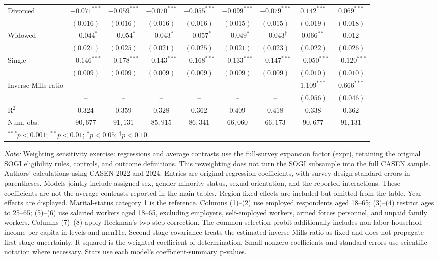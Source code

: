 \begin{table}[htpb]
{\begin{tabular}{l c c c c c c c c}
Divorced & $-0.071^{***}$ & $-0.059^{***}$ & $-0.070^{***}$ & $-0.055^{***}$ & $-0.099^{***}$ & $-0.079^{***}$ & $0.142^{***}$ & $0.069^{***}$ \\
 & $(0.016)$ & $(0.016)$ & $(0.016)$ & $(0.016)$ & $(0.015)$ & $(0.015)$ & $(0.019)$ & $(0.018)$ \\
Widowed & $-0.044^{*}$ & $-0.054^{*}$ & $-0.043^{*}$ & $-0.057^{*}$ & $-0.049^{*}$ & $-0.043^{\dagger}$ & $0.066^{**}$ & $0.012$ \\
 & $(0.021)$ & $(0.025)$ & $(0.021)$ & $(0.025)$ & $(0.021)$ & $(0.023)$ & $(0.022)$ & $(0.026)$ \\
Single & $-0.146^{***}$ & $-0.178^{***}$ & $-0.143^{***}$ & $-0.168^{***}$ & $-0.133^{***}$ & $-0.147^{***}$ & $-0.050^{***}$ & $-0.120^{***}$ \\
 & $(0.009)$ & $(0.009)$ & $(0.009)$ & $(0.009)$ & $(0.009)$ & $(0.009)$ & $(0.010)$ & $(0.010)$ \\
Inverse Mills ratio & -- & -- & -- & -- & -- & -- & $1.109^{***}$ & $0.666^{***}$ \\
 & -- & -- & -- & -- & -- & -- & $(0.056)$ & $(0.046)$ \\
\hline
R$^2$ & $0.324$ & $0.359$ & $0.328$ & $0.362$ & $0.409$ & $0.418$ & $0.338$ & $0.362$ \\
Num. obs. & $90,677$ & $91,131$ & $85,915$ & $86,341$ & $66,060$ & $66,173$ & $90,677$ & $91,131$ \\
\hline
\multicolumn{9}{l}{\scriptsize $^{***}p<0.001$; $^{**}p<0.01$; $^{*}p<0.05$; $^{\dagger}p<0.10$.} \\
\end{tabular}%
}
\par\smallskip
\begin{minipage}{\textwidth}\footnotesize\raggedright
\textit{Note:} Weighting sensitivity exercise: regressions and average contrasts use the full-survey expansion factor (expr), retaining the original SOGI eligibility rules, controls, and outcome definitions. This reweighting does not turn the SOGI subsample into the full CASEN sample. Authors' calculations using CASEN 2022 and 2024. Entries are original regression coefficients, with survey-design standard errors in parentheses. Models jointly include assigned sex, gender-minority status, sexual orientation, and the reported interactions. These coefficients are not the average contrasts reported in the main tables. Region fixed effects are included but omitted from the table. Year effects are displayed. Marital-status category 1 is the reference. Columns (1)--(2) use employed respondents aged 18--65; (3)--(4) restrict ages to 25--65; (5)--(6) use salaried workers aged 18--65, excluding employers, self-employed workers, armed forces personnel, and unpaid family workers. Columns (7)--(8) apply Heckman's two-step correction. The common selection probit additionally includes non-labor household income per capita in levels and men11c. Second-stage covariance treats the estimated inverse Mills ratio as fixed and does not propagate first-stage uncertainty. R-squared is the weighted coefficient of determination. Small nonzero coefficients and standard errors use scientific notation where necessary. Stars use each model's coefficient-summary p-values.

\end{minipage}
\end{table}
